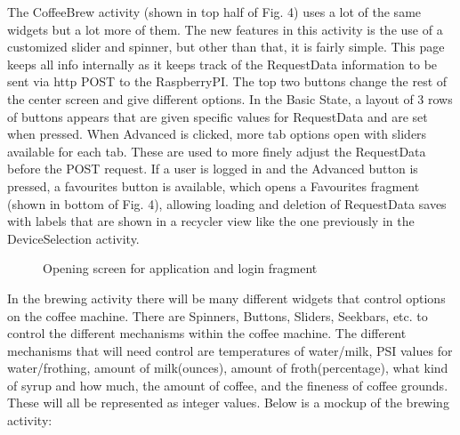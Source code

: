 \documentclass[conference]{IEEEtran}
\begin{document}
The CoffeeBrew activity (shown in top half of Fig. 4) uses
a lot of the same widgets but a lot more of them. The new
features in this activity is the use of a customized slider and
spinner, but other than that, it is fairly simple. This page
keeps all info internally as it keeps track of the RequestData
information to be sent via http POST to the RaspberryPI. The
top two buttons change the rest of the center screen and give
different options. In the Basic State, a layout of 3 rows of
buttons appears that are given specific values for RequestData
and are set when pressed. When Advanced is clicked, more
tab options open with sliders available for each tab. These
are used to more finely adjust the RequestData before the
POST request. If a user is logged in and the Advanced button
is pressed, a favourites button is available, which opens a
Favourites fragment (shown in bottom of Fig. 4), allowing
loading and deletion of RequestData saves with labels that
are shown in a recycler view like the one previously in the
DeviceSelection activity.


\begin{figure}
    \begin{subfigure}
        \texttt{[image: mainmenu]}
    \end{subfigure}
\hspace{5mm}
    \begin{subfigure}
    \end{subfigure}
\caption{Opening screen for application and login fragment}
\end{figure}

In the brewing activity there will be many different widgets that control options
on the coffee machine. There are Spinners, Buttons, Sliders, Seekbars, etc. to control
the different mechanisms within the coffee machine. The different
mechanisms that will need control are temperatures of water/milk, PSI values for water/frothing,
amount of milk(ounces), amount of froth(percentage), what kind of syrup and how much, the amount of coffee, and the fineness
of coffee grounds. These will all be represented as integer values. Below is a mockup of the brewing activity:
\end{document}
